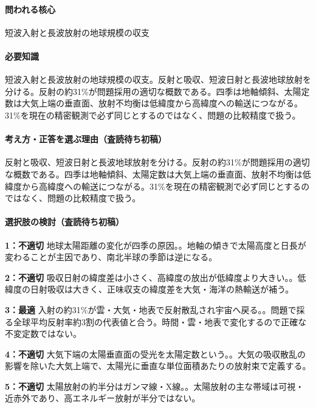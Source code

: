 \paragraph{問われる核心} 短波入射と長波放射の地球規模の収支

\paragraph{必要知識} 短波入射と長波放射の地球規模の収支。反射と吸収、短波日射と長波地球放射を分ける。反射の約31\%が問題採用の適切な概数である。四季は地軸傾斜、太陽定数は大気上端の垂直面、放射不均衡は低緯度から高緯度への輸送につながる。31\%を現在の精密観測で必ず同じとするのではなく、問題の比較精度で扱う。

\paragraph{考え方・正答を選ぶ理由（査読待ち初稿）} 反射と吸収、短波日射と長波地球放射を分ける。反射の約31\%が問題採用の適切な概数である。四季は地軸傾斜、太陽定数は大気上端の垂直面、放射不均衡は低緯度から高緯度への輸送につながる。31\%を現在の精密観測で必ず同じとするのではなく、問題の比較精度で扱う。

\paragraph{選択肢の検討（査読待ち初稿）}\mbox{}\par

\noindent\textbf{1：不適切} 地球太陽距離の変化が四季の原因。。地軸の傾きで太陽高度と日長が変わることが主因であり、南北半球の季節は逆になる。\par

\noindent\textbf{2：不適切} 吸収日射の緯度差は小さく、高緯度の放出が低緯度より大きい。。低緯度の日射吸収は大きく、正味収支の緯度差を大気・海洋の熱輸送が補う。\par

\noindent\textbf{3：最適} 入射の約31\%が雲・大気・地表で反射散乱され宇宙へ戻る。。問題で採る全球平均反射率約3割の代表値と合う。時間・雲・地表で変化するので正確な不変定数ではない。\par

\noindent\textbf{4：不適切} 大気下端の太陽垂直面の受光を太陽定数という。。大気の吸収散乱の影響を除いた大気上端で、太陽光に垂直な単位面積あたりの放射束で定義する。\par

\noindent\textbf{5：不適切} 太陽放射の約半分はガンマ線・X線。。太陽放射の主な帯域は可視・近赤外であり、高エネルギー放射が半分ではない。\par

